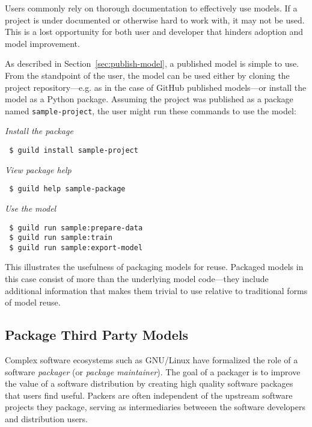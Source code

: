 \documentclass{article}
\begin{document}
Users commonly rely on thorough documentation to effectively use
models. If a project is under documented or otherwise hard to work
with, it may not be used. This is a lost opportunity for both user and
developer that hinders adoption and model improvement.

As described in Section~\ref{sec:publish-model}, a published model is
simple to use. From the standpoint of the user, the model can be used
either by cloning the project repository---e.g. as in the case of
GitHub published models---or install the model as a Python
package. Assuming the project was published as a package named
\verb|sample-project|, the user might run these commands to use the
model:

\setlength{\parindent}{1em}

{\footnotesize\emph{Install the package}}

{\footnotesize
\begin{verbatim}
 $ guild install sample-project
\end{verbatim}}

{\footnotesize\emph{View package help}}

{\footnotesize
\begin{verbatim}
 $ guild help sample-package
\end{verbatim}}

{\footnotesize\emph{Use the model}}

{\footnotesize
\begin{verbatim}
 $ guild run sample:prepare-data
 $ guild run sample:train
 $ guild run sample:export-model
\end{verbatim}}

\setlength{\parindent}{0em}

This illustrates the usefulness of packaging models for
reuse. Packaged models in this case consist of more than the
underlying model code---they include additional information that makes
them trivial to use relative to traditional forms of model reuse.

\subsection{Package Third Party Models}
\label{sec:package-maintainer}

Complex software ecosystems such as GNU/Linux have formalized the role
of a software \emph{packager} (or \emph{package maintainer}). The goal
of a packager is to improve the value of a software distribution by
creating high quality software packages that users find
useful. Packers are often independent of the upstream software
projects they package, serving as intermediaries betweeen the software
developers and distribution users.
\end{document}
